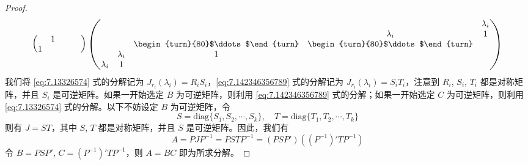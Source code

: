 \documentclass[../../main.tex]{subfiles}%
\begin{document}
\begin{proof}
\begin{align}
\begin{pmatrix}
& 1 & & & \\
1 & & & &
\end{pmatrix}
\begin{pmatrix}
& & & & \lambda_i \\
& & & \lambda_i & 1 \\
& & \begin{turn}{80}$\ddots$\end{turn} & \begin{turn}{80}$\ddots$\end{turn} & \\
& \lambda_i & 1 & & \\
\lambda_i & 1 & & &
\end{pmatrix}
\label{eq:7.142346356789}
\end{align}
我们将 \eqref{eq:7.13326574} 式的分解记为 $J_{r_i}(\lambda_i) = R_iS_i$，\eqref{eq:7.142346356789} 式的分解记为 $J_{r_i}(\lambda_i) = S_iT_i$，注意到 $R_i$, $S_i$, $T_i$ 都是对称矩阵，并且 $S_i$ 是可逆矩阵。如果一开始选定 $B$ 为可逆矩阵，则利用 \eqref{eq:7.142346356789} 式的分解；如果一开始选定 $C$ 为可逆矩阵，则利用 \eqref{eq:7.13326574} 式的分解。以下不妨设定 $B$ 为可逆矩阵，令
\[
S = \mathrm{diag}\{S_1,S_2,\cdots,S_k\}, \quad T = \mathrm{diag}\{T_1,T_2,\cdots,T_k\}
\]
则有 $J = ST$，其中 $S$, $T$ 都是对称矩阵，并且 $S$ 是可逆矩阵。因此，我们有
\[
A = PJP^{-1} = PSTP^{-1} = (PSP')((P^{-1})'TP^{-1})
\]
令 $B = PSP'$, $C = (P^{-1})'TP^{-1}$，则 $A = BC$ 即为所求分解。

\end{proof}
\end{document}
